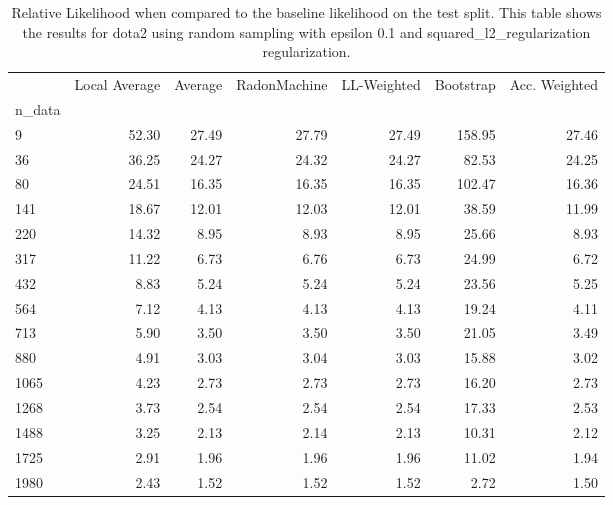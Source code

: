 \begin{table}
\centering
\caption{Relative Likelihood when compared to the baseline likelihood on the test split. This table shows the results for  dota2 using  random sampling with epsilon  0.1 and  squared_l2_regularization regularization.}
\label{tab:14}
\begin{tabular}{lrrrrrr}
\toprule
{} &  Local Average &  Average &  RadonMachine &  LL-Weighted &  Bootstrap &  Acc. Weighted \\
n\_data &                &          &               &              &            &                \\
\midrule
9      &          52.30 &    27.49 &         27.79 &        27.49 &     158.95 &          27.46 \\
36     &          36.25 &    24.27 &         24.32 &        24.27 &      82.53 &          24.25 \\
80     &          24.51 &    16.35 &         16.35 &        16.35 &     102.47 &          16.36 \\
141    &          18.67 &    12.01 &         12.03 &        12.01 &      38.59 &          11.99 \\
220    &          14.32 &     8.95 &          8.93 &         8.95 &      25.66 &           8.93 \\
317    &          11.22 &     6.73 &          6.76 &         6.73 &      24.99 &           6.72 \\
432    &           8.83 &     5.24 &          5.24 &         5.24 &      23.56 &           5.25 \\
564    &           7.12 &     4.13 &          4.13 &         4.13 &      19.24 &           4.11 \\
713    &           5.90 &     3.50 &          3.50 &         3.50 &      21.05 &           3.49 \\
880    &           4.91 &     3.03 &          3.04 &         3.03 &      15.88 &           3.02 \\
1065   &           4.23 &     2.73 &          2.73 &         2.73 &      16.20 &           2.73 \\
1268   &           3.73 &     2.54 &          2.54 &         2.54 &      17.33 &           2.53 \\
1488   &           3.25 &     2.13 &          2.14 &         2.13 &      10.31 &           2.12 \\
1725   &           2.91 &     1.96 &          1.96 &         1.96 &      11.02 &           1.94 \\
1980   &           2.43 &     1.52 &          1.52 &         1.52 &       2.72 &           1.50 \\
\bottomrule
\end{tabular}
\end{table}
